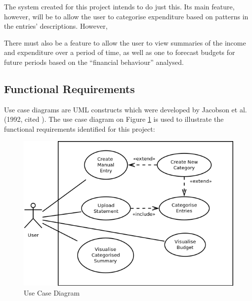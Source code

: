 The system created for this project intends to do just this. Its main feature,
however, will be to allow the user to categorise expenditure based on patterns
in the entries' descriptions. However, 

There must also be a feature to allow the user to view summaries of the income
and expenditure over a period of time, as well as one to forecast budgets for
future periods based on the ``financial behaviour'' analysed.

\subsection{Functional Requirements} \label{sec:Requirements.FunctionalRequirements}

Use case diagrams are UML constructs which were developed by Jacobson et al.
(1992, cited \cite[][p.~154]{bennett2010object}). The use case diagram on
Figure \ref{fig:UseCaseDiagram} is used to illustrate the functional
requirements identified for this project:
\begin{figure}[ht!]
  \begin{center}
    \includegraphics[width=14cm]{./contents/img/Use_Case_Diagram.png}
  \end{center}
  \caption{Use Case Diagram}
  \label{fig:UseCaseDiagram}
\end{figure}
\FloatBarrier

